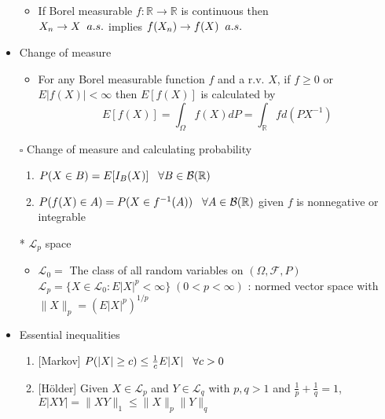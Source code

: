 \documentclass[12pt, A4]{article}
\begin{document}
\begin{itemize}
    \begin{itemize}
    	\item If Borel measurable $f:\mathbb{R}\rightarrow\mathbb{R}$ is continuous then \\$X_n\rightarrow X \hspace{0.2cm} a.s.$ implies $f(X_n)\rightarrow f(X) \hspace{0.2cm} a.s.$  
    \end{itemize}
    \item Change of measure
    \begin{itemize}
    	\item For any Borel measurable function $f$ and a r.v. $X$, \newline if $f\geq 0$ or $E|f(X)|<\infty$ then $E[f(X)]$ is calculated by $$E[f(X)]=\int_{\Omega} f(X) dP=\int_{\mathbb{R}} f d(PX^{-1})$$ 
    \end{itemize}
    \item[$\square$] Change of measure and calculating probability 
    \begin{enumerate}
    	\item $P(X\in B)=E[I_B(X)] \hspace{0.3cm} \forall B\in \mathcal{B}(\mathbb{R})$
    	\item $P(f(X)\in A)=P(X\in f^{-1}(A)) \hspace{0.3cm} \forall A\in \mathcal{B}(\mathbb{R})$ \newline given $f$ is nonnegative or integrable
    \end{enumerate}
    \item[*] $\mathcal{L}_p$ space
    \begin{itemize}
    	\item $\mathcal{L}_0=$ The class of all random variables on $(\Omega, \mathcal{F}, P)$ \\ $\mathcal{L}_p=\{X\in \mathcal{L}_0:  E|X|^p< \infty\}\; (0<p<\infty)$ : normed vector space with $\|X\|_p=(E|X|^p)^{1/p}$
    \end{itemize}  
    \item Essential inequalities
    \begin{enumerate}
    	\item {[Markov]} $P(|X|\geq c)\leq \frac{1}{c}E|X| \hspace{0.3cm} \forall c>0$
    	\item {[H\"{o}lder]} Given $X\in \mathcal{L}_p$ and $Y\in \mathcal{L}_q$ with $p,q>1$ and $\frac{1}{p}+\frac{1}{q}=1$, \newline $E|XY|=\|XY\|_1\leq \|X\|_p\|Y\|_q$

\end{enumerate}
\end{itemize}
\end{document}
